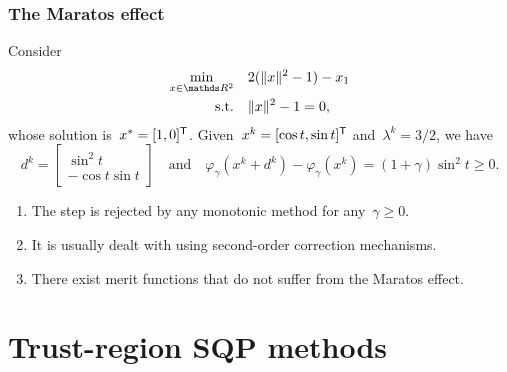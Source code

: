 \documentclass{polyu-presentation}
\begin{document}
\begin{frame}
    \frametitle{The Maratos effect}

    Consider
    \begin{align*}
        \min_{x \in \R^2}   & \quad 2(\norm{x}^2 - 1) - x_1\\
        \text{s.t.}         & \quad \norm{x}^2 - 1 = 0,
    \end{align*}
    whose \alert{solution} is~$x^{\ast} = [1, 0]^{\mathsf{T}}$.
    Given~$x^k = [\cos t, \sin t]^{\mathsf{T}}$ and~$\lambda^k = 3/2$, we have
    \begin{equation*}
        d^k =
        \begin{bmatrix}
            \sin^2 t\\
            - \cos t \sin t
        \end{bmatrix}
        \quad \text{and} \quad
        \varphi_{\gamma}(x^k + d^k) - \varphi_{\gamma}(x^k) = (1 + \gamma) \sin^2 t \ge 0.
    \end{equation*}

    \begin{block}{}
        \begin{enumerate}[<+(1)->]
            \item The step is \alert{rejected} by any \alert{monotonic} method for any~$\gamma \ge 0$.
            \item It is usually dealt with using \alert{second-order correction} mechanisms.
            \item There exist merit functions that do \alert{not} suffer from the Maratos effect.
        \end{enumerate}
    \end{block}
\end{frame}

\section{Trust-region SQP methods}
\end{document}
